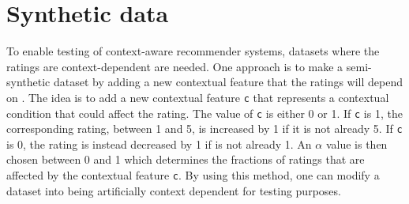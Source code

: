 \section{Synthetic data}
To enable testing of context-aware recommender systems, datasets where the ratings are context-dependent are needed.
One approach is to make a semi-synthetic dataset by adding a new contextual feature that the ratings will depend on \cite{baltrunasContextItemSplit}.
The idea is to add a new contextual feature \texttt{c} that represents a contextual condition that could affect the rating.
The value of \texttt{c} is either 0 or 1. 
If \texttt{c} is 1, the corresponding rating, between 1 and 5, is increased by 1 if it is not already 5.
If \texttt{c} is 0, the rating is instead decreased by 1 if is not already 1.
An $\alpha$ value is then chosen between 0 and 1 which determines the fractions of ratings that are affected by the contextual feature \texttt{c}.
By using this method, one can modify a dataset into being artificially context dependent for testing purposes.
